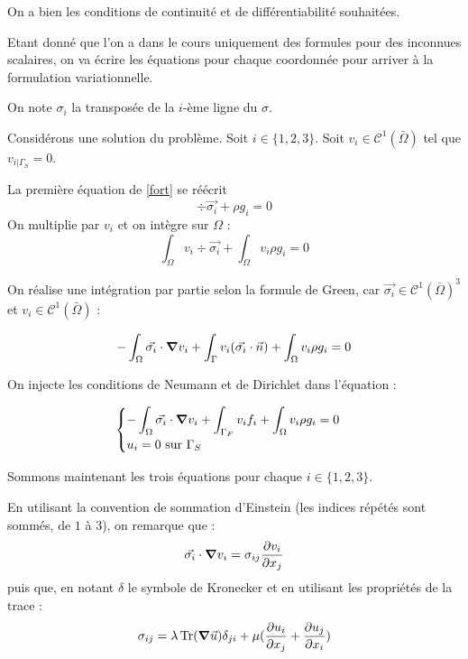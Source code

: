 On a bien les conditions de continuité et de différentiabilité souhaitées. %

Etant donné que l'on a dans le cours uniquement des formules pour des inconnues scalaires, on va écrire les équations pour chaque coordonnée pour arriver à la formulation variationnelle.

On note $\sigma_i$ la transposée de la $i$-ème ligne du $\sigma$.

Considérons une solution du problème.
Soit $i \in \{1,2,3\}$.
Soit $v_i \in \mathcal{C}^1(\bar{\Omega})$ tel que $v_{i|\Gamma_S} = 0$.


La première équation de \eqref{fort} se réécrit 
$$\div \vec{\sigma_i} + \rho g_i = 0$$
On multiplie par $v_i$ et on intègre sur $\Omega$ :
$$\int_\Omega v_i \div \vec{\sigma_i} +  \int_\Omega v_i \rho g_i = 0$$

On réalise une intégration par partie selon la formule de Green, car $\vec{\sigma_i} \in \mathcal{C}^1(\bar{\Omega})^3$ et $v_i \in \mathcal{C}^1(\bar{\Omega})$ :


\begin{equation}\label{green}
    -\int_{\Omega} \vec{\sigma_i} \cdot \grad v_i + \int_{\Gamma} v_i (\vec{\sigma_i} \cdot \vec{n}) + \int_\Omega v_i \rho g_i = 0
\end{equation}

On injecte les conditions de Neumann et de Dirichlet dans l'équation : %

\begin{equation}
    \begin{cases}
        -\displaystyle\int_{\Omega} \vec{\sigma_i} \cdot \grad v_i + \int_{\Gamma_F} v_i f_i + \int_\Omega v_i \rho g_i = 0\\
        u_i = 0 \textrm{ sur } \Gamma_S
    \end{cases}
\end{equation}

Sommons maintenant les trois équations pour chaque $i \in \{1,2,3\}$.

En utilisant la convention de sommation d'Einstein (les indices répétés sont sommés, de $1$ à $3$), on remarque que :
$$
\vec{\sigma_i} \cdot \grad v_i = \sigma_{ij} \frac{\partial v_i}{\partial x_j}
$$
puis que, en notant $\delta$ le symbole de Kronecker et en utilisant les propriétés de la trace :
$$
\sigma_{ij} = \lambda \operatorname{Tr}(\grad \vec{u}) \delta_{ji} + \mu (\frac{\partial u_i}{\partial x_j} + \frac{\partial u_j}{\partial x_i})
$$


